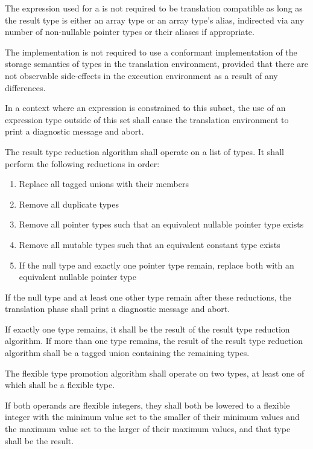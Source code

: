 \specsubitem
The expression used for a  is not required to be
translation compatible as long as the result type is either an array type or an
array type's alias, indirected via any number of non-nullable pointer types or
their aliases if appropriate.

\specsubitem
The implementation is not required to use a conformant implementation of the
storage semantics of types in the translation environment, provided that there
are not observable side-effects in the execution environment as a result of any
differences.

\specsubitem
In a context where an expression is constrained to this subset, the use of an
expression type outside of this set shall cause the translation environment to
print a diagnostic message and abort.


\specsubitem
The result type reduction algorithm shall operate on a list of types. It shall
perform the following reductions in order:

\begin{enumerate}
\item Replace all tagged unions with their members
\item Remove all duplicate types
\item Remove all pointer types such that an equivalent nullable pointer type
	exists
\item Remove all mutable types such that an equivalent constant type exists
\item If the null type and exactly one pointer type remain, replace both with an
	equivalent nullable pointer type
\end{enumerate}

\specsubitem
If the null type and at least one other type remain after these reductions, the
translation phase shall print a diagnostic message and abort.

\specsubitem
If exactly one type remains, it shall be the result of the result type reduction
algorithm. If more than one type remains, the result of the result type
reduction algorithm shall be a tagged union containing the remaining types.


\specsubitem
The flexible type promotion algorithm shall operate on two types, at least one
of which shall be a flexible type.

\specsubitem
If both operands are flexible integers, they shall both be lowered to a flexible
integer with the minimum value set to the smaller of their minimum values and
the maximum value set to the larger of their maximum values, and that type shall
be the result.

